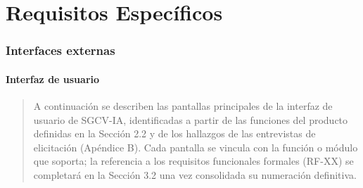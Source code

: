 \section{Requisitos Específicos}\label{requisitos-especuxedficos}

\subsubsection{Interfaces externas}\label{interfaces-externas}

\paragraph{Interfaz de usuario}\label{interfaz-de-usuario}

\begin{quote}
A continuación se describen las pantallas principales de la interfaz de
usuario de SGCV-IA, identificadas a partir de las funciones del producto
definidas en la Sección 2.2 y de los hallazgos de las entrevistas de
elicitación (Apéndice B). Cada pantalla se vincula con la función o
módulo que soporta; la referencia a los requisitos funcionales formales
(RF-XX) se completará en la Sección 3.2 una vez consolidada su
numeración definitiva.
\end{quote}

